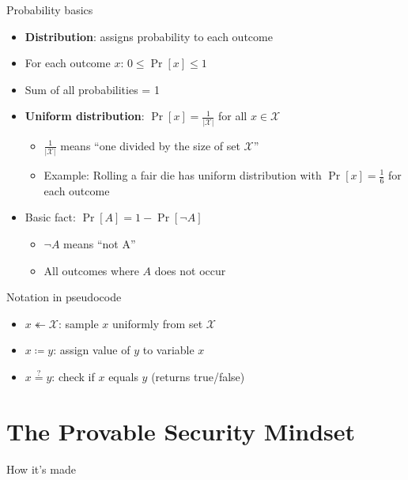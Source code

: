 \documentclass[aspectratio=169, lualatex, handout]{beamer}
\begin{document}
\begin{frame}{Probability basics}
	\begin{itemize}[<+->]
		\item \textbf{Distribution}: assigns probability to each outcome
		\item For each outcome $x$: $0 \leq \Pr[x] \leq 1$
		\item Sum of all probabilities = 1
		\item \textbf{Uniform distribution}: $\Pr[x] = \frac{1}{|\mathcal{X}|}$ for all $x \in \mathcal{X}$
		      \begin{itemize}
			      \item $\frac{1}{|\mathcal{X}|}$ means ``one divided by the size of set $\mathcal{X}$''
			      \item Example: Rolling a fair die has uniform distribution with $\Pr[x] = \frac{1}{6}$ for each outcome
		      \end{itemize}
		\item Basic fact: $\Pr[A] = 1 - \Pr[\neg A]$
		      \begin{itemize}
			      \item $\neg A$ means ``not A''
			      \item All outcomes where $A$ does not occur
		      \end{itemize}
	\end{itemize}
\end{frame}

\begin{frame}{Notation in pseudocode}
	\begin{itemize}[<+->]
		\item $x \twoheadleftarrow \mathcal{X}$: sample $x$ uniformly from set $\mathcal{X}$
		\item $x \coloneq y$: assign value of $y$ to variable $x$
		\item $x \stackrel{?}{=} y$: check if $x$ equals $y$ (returns true/false)
	\end{itemize}
\end{frame}

\section{The Provable Security Mindset}

\begin{frame}{How it's made}
\end{frame}
\end{document}
